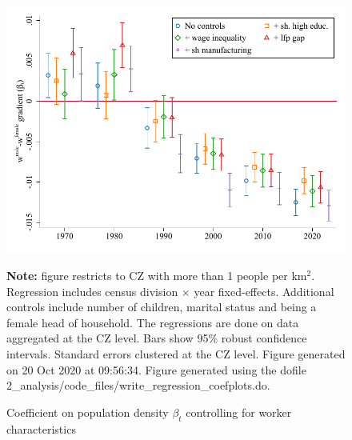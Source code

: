 \begin{figure}[!h]
\centering
\caption{Coefficient on population density $ \beta_t $ controlling for worker characteristics}
\includegraphics[width=.6\textwidth]{../2_analysis/output/figures/with_control_gradients_czone_l_czone_pop_full_time}
\par \begin{minipage}[h]{\textwidth}{\tiny\textbf{Note:} figure restricts to CZ with more than 1 people per km$^2$. Regression includes census division $\times $ year fixed-effects. Additional controls include number of children, marital status and being a female head of household. The regressions are done on data aggregated at the CZ level. Bars show 95\% robust confidence intervals. Standard errors clustered at the CZ level. Figure generated on 20 Oct 2020 at 09:56:34. Figure generated using the dofile 2\_analysis/code\_files/write\_regression\_coefplots.do.}\end{minipage}
\end{figure}
